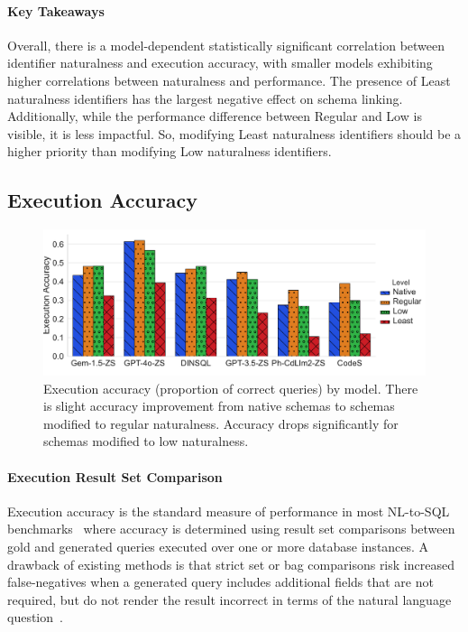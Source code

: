 \paragraph{\textbf{Key Takeaways}}
Overall, there is a model-dependent statistically significant correlation between identifier naturalness and execution accuracy, with smaller models exhibiting higher correlations between naturalness and performance.
The presence of Least naturalness identifiers has the largest negative effect on schema linking.
Additionally, while the performance difference between Regular and Low is visible, it is less impactful. 
So, modifying Least naturalness identifiers should be a  higher priority than modifying Low naturalness identifiers.

\subsection{Execution Accuracy}

\begin{figure}
  \centering
  \includegraphics[width=\figwidthmod\linewidth]{figures/execution-accuracy-barplot.pdf}
  \caption{Execution accuracy (proportion of correct queries) by model. There is slight accuracy improvement from native schemas to schemas modified to regular naturalness. Accuracy drops significantly for schemas modified to low naturalness.}
  \label{fig:execution-accuracy-barplot}
\end{figure}

\paragraph{\textbf{Execution Result Set Comparison}}
Execution accuracy is the standard measure of performance in most NL-to-SQL benchmarks~\cite{li2023llm, Yu&al.18c} where accuracy is determined using result set comparisons between gold and generated queries executed over one or more database instances.
A drawback of existing methods is that strict set or bag comparisons risk increased false-negatives when a generated query includes additional fields that are not required, but do not render the result incorrect in terms of the natural language question~\cite{10023434, floratou2024nl2sql}.

